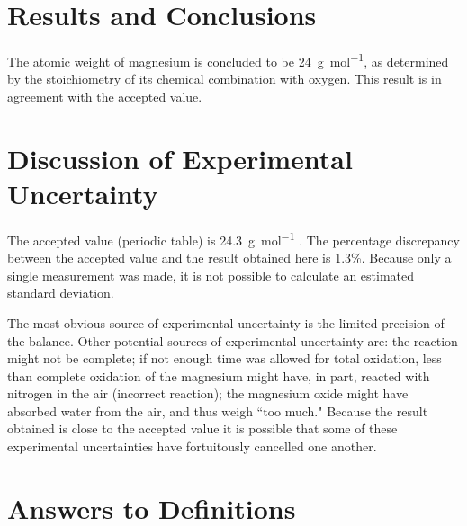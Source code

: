 \documentclass{article}
\begin{document}
	
	
	\section{Results and Conclusions}
	
	The atomic weight of magnesium is concluded to be \SI{24}{\gram\per\mol}, as determined by the stoichiometry of its chemical combination with oxygen. This result is in agreement with the accepted value.
	

	
	
	\section{Discussion of Experimental Uncertainty}
	
	The accepted value (periodic table) is \SI{24.3}{\gram\per\mole} \cite{Smith:2012qr}. The percentage discrepancy between the accepted value and the result obtained here is 1.3\%. Because only a single measurement was made, it is not possible to calculate an estimated standard deviation.
	
	The most obvious source of experimental uncertainty is the limited precision of the balance. Other potential sources of experimental uncertainty are: the reaction might not be complete; if not enough time was allowed for total oxidation, less than complete oxidation of the magnesium might have, in part, reacted with nitrogen in the air (incorrect reaction); the magnesium oxide might have absorbed water from the air, and thus weigh ``too much." Because the result obtained is close to the accepted value it is possible that some of these experimental uncertainties have fortuitously cancelled one another.
	
	
	\section{Answers to Definitions}
	
\end{document}
